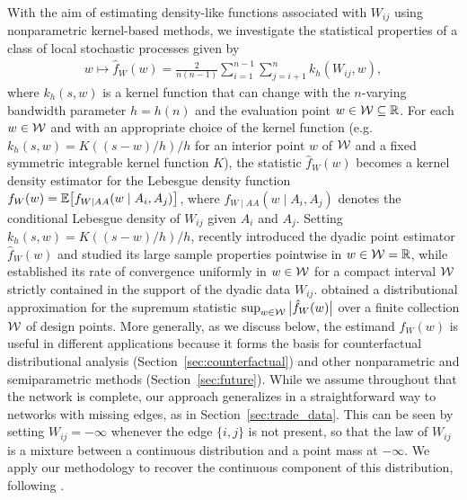 With the aim of estimating density-like functions associated with $W_{i j}$
using nonparametric kernel-based methods, we investigate the statistical
properties of a class of local stochastic processes given by
%
\begin{align}\label{eq:kernel_estimator}
  w \mapsto \hat{f}_W(w)
  = \frac{2}{n(n-1)} \sum_{i=1}^{n-1} \sum_{j=i+1}^n k_h(W_{i j},w),
\end{align}
%
where $k_h(s,w)$ is a kernel function that can change with the $n$-varying
bandwidth parameter $h=h(n)$ and the evaluation point $w \in \mathcal{W}\subseteq \mathbb{R}$.
For each $w\in\mathcal{W}$ and with an appropriate choice of the kernel function
(e.g.\ $k_h(s,w)=K((s-w)/h)/h$ for an interior point $w$ of $\mathcal{W}$ and a
fixed symmetric integrable kernel function $K$), the statistic $\hat{f}_W(w)$
becomes a kernel density estimator for the Lebesgue density function
$f_W(w) = \mathbb{E}\big[f_{W \mid AA}(w \mid A_i,A_j)\big]$, where
$f_{W \mid AA}(w \mid A_i,A_j)$ denotes the conditional Lebesgue density of
$W_{i j}$ given $A_i$ and $A_j$. Setting $k_h(s,w)=K((s-w)/h)/h$,
\citet{graham2024kernel} recently introduced the dyadic point estimator
$\hat{f}_W(w)$ and studied its large sample properties pointwise in
$w\in\mathcal{W}=\mathbb{R}$, while \citet{chiang2020empirical} established its rate of
convergence uniformly in $w\in\mathcal{W}$ for a compact interval $\mathcal{W}$ strictly
contained in the support of the dyadic data $W_{i j}$.
\citet{chiang2022inference} obtained a distributional approximation for the
supremum statistic $\sup_{w\in\mathcal{W}}\big|\hat{f}_W(w)\big|$ over a finite
collection $\mathcal{W}$ of design points. More generally, as we discuss below, the
estimand $f_W(w)$ is useful in different applications because it forms the
basis for counterfactual distributional analysis
(Section~\ref{sec:counterfactual}) and other nonparametric and semiparametric
methods (Section~\ref{sec:future}). While we assume throughout
that the network is complete, our approach generalizes in a straightforward way
to networks with missing edges, as in Section~\ref{sec:trade_data}. This can be
seen by setting $W_{i j} = -\infty$ whenever the edge $\{i, j\}$ is not
present, so that the law of $W_{i j}$ is a mixture between a continuous
distribution and a point mass at $-\infty$. We apply our methodology to
recover the continuous component of this distribution, following
\citet{chiang2022inference}.

